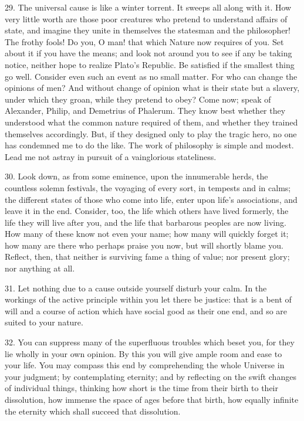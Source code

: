 \documentclass{book}
\begin{document}
29. The universal cause is like a winter torrent. It sweeps all along
with it. How very little worth are those poor creatures who pretend to
understand affairs of state, and imagine they unite in themselves the
statesman and the philosopher! The frothy fools! Do you, O man! that
which Nature now requires of you. Set about it if you have the means;
and look not around you to see if any be taking notice, neither hope
to realize Plato's Republic. Be satisfied if the smallest thing go
well. Consider even such an event as no small matter. For who can
change the opinions of men? And without change of opinion what is
their state but a slavery, under which they groan, while they pretend
to obey? Come now; speak of Alexander, Philip, and Demetrius of
Phalerum. They know best whether they understood what the common
nature required of them, and whether they trained themselves
accordingly. But, if they designed only to play the tragic hero, no
one has condemned me to do the like. The work of philosophy is simple
and modest. Lead me not astray in pursuit of a vainglorious
stateliness.

30. Look down, as from some eminence, upon the innumerable herds, the
countless solemn festivals, the voyaging of every sort, in tempests
and in calms; the different states of those who come into life, enter
upon life's associations, and leave it in the end. Consider, too, the
life which others have lived formerly, the life they will live after
you, and the life that barbarous peoples are now living. How many of
these know not even your name; how many will quickly forget it; how
many are there who perhaps praise you now, but will shortly blame
you. Reflect, then, that neither is surviving fame a thing of value;
nor present glory; nor anything at all.

31. Let nothing due to a cause outside yourself disturb your calm. In
the workings of the active principle within you let there be justice:
that is a bent of will and a course of action which have social good
as their one end, and so are suited to your nature.

32. You can suppress many of the superfluous troubles which beset you,
for they lie wholly in your own opinion. By this you will give ample
room and ease to your life. You may compass this end by comprehending
the whole Universe in your judgment; by contemplating eternity; and by
reflecting on the swift changes of individual things, thinking how
short is the time from their birth to their dissolution, how immense
the space of ages before that birth, how equally infinite the eternity
which shall succeed that dissolution.
\end{document}
